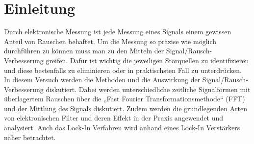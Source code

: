 
\chapter{Einleitung}
\label{chap:einleitung}

Durch elektronische Messung ist jede Messung eines Signals einem gewissen Anteil von Rauschen behaftet. Um die Messung so präzise wie möglich durchführen zu können muss man zu den Mitteln der Signal/Rausch-Verbesserung greifen. Dafür ist wichtig die jeweiligen Störquellen zu identifizieren und diese bestenfalls zu eliminieren oder in praktischsten Fall zu unterdrücken.\\

In diesem Versuch werden die Methoden und die Auswirkung der Signal/Rausch-Verbesserung diskutiert. Dabei werden unterschiedliche zeitliche Signalformen mit überlagertem Rauschen über die „Fast Fourier Transformationsmethode“ (FFT) und der Mittlung des Signals diskutiert. Zudem werden die grundlegenden Arten von elektronischen Filter und deren Effekt in der Praxis angewendet und analysiert. Auch das Lock-In Verfahren wird anhand eines Lock-In Verstärkers näher betrachtet.